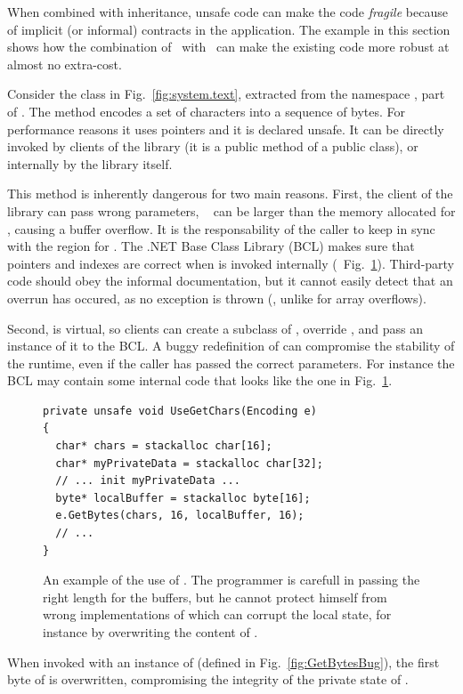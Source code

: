 \documentclass[10pt]{sigplanconf}
\begin{document}
When combined with inheritance, unsafe code can make the code \emph{fragile} because of implicit (or informal) contracts in the application.
The example in this section shows how the combination of \Foxtrot\ with \Clousot\ can make the existing code more robust at almost no extra-cost.

Consider the class in Fig.~\ref{fig:system.text}, extracted from the namespace , part of .
The method  encodes a set of characters into a sequence of bytes.
For performance reasons it uses pointers and it is declared unsafe. 
It can be directly invoked by clients of the library (it is a public method of a public class), or internally by the library itself.

This method is inherently dangerous for two main reasons.  First, the
client of the library can pass wrong parameters, \eg\ 
can be larger than the memory allocated for , causing a
buffer overflow.  It is the responsability of the caller to keep
 in sync with the region for .  The .NET
Base Class Library (BCL)
makes sure that pointers and indexes are correct when 
is invoked internally (\eg\ Fig.~\ref{fig:BCLLike}).  Third-party code
should obey the informal documentation, but it cannot easily
detect that an overrun has occured, as no exception is thrown (\eg,
unlike  for array overflows).

Second,  is virtual, so clients can create a subclass of , override , and pass an instance of it to the BCL. 
A buggy redefinition of  can compromise the stability of the runtime, even if the caller has passed the correct parameters.
For instance the BCL may contain some internal code that looks like  the one in Fig.~\ref{fig:BCLLike}.
\begin{figure}[t]
\begin{lstlisting}
private unsafe void UseGetChars(Encoding e)
{
  char* chars = stackalloc char[16];
  char* myPrivateData = stackalloc char[32];
  // ... init myPrivateData ...
  byte* localBuffer = stackalloc byte[16];
  e.GetBytes(chars, 16, localBuffer, 16);
  // ... 
}
\end{lstlisting}
\caption{An example of the use of . The programmer is carefull  in passing the right length for the buffers, but he cannot protect himself from wrong implementations of  which can corrupt the local state, for instance by overwriting the content of . }
\label{fig:BCLLike}
\end{figure}
When invoked with an instance of  (defined in
Fig.~\ref{fig:GetBytesBug}), the first byte of  is
overwritten, compromising the integrity of the private state of
.
\end{document}
